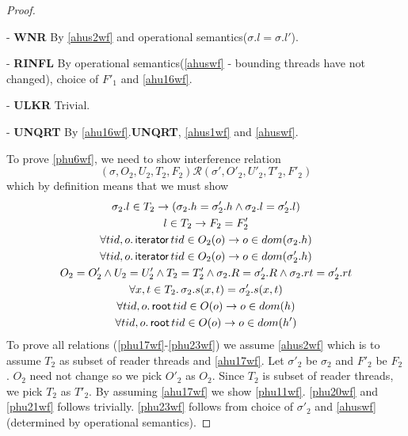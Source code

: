 \begin{proof}
\begin{case} - \textbf{WNR} By \ref{ahus2wf} and operational semantics($\sigma.l = \sigma.l'$).
\end{case}
\begin{case} - \textbf{RINFL} By operational semantics(\ref{ahuswf} - bounding threads have not changed), choice of $F'_1$ and \ref{ahu16wf}. 
\end{case}
\begin{case} - \textbf{ULKR} Trivial. 
\end{case}
\begin{case} - \textbf{UNQRT} By \ref{ahu16wf}.\textbf{UNQRT}, \ref{ahus1wf} and \ref{ahuswf}.
\end{case}

To prove \ref{phu6wf}, we need to show interference relation
\[(\sigma, O_2, U_2, T_2,F_2) \mathcal{R} (\sigma', O'_2, U'_2, T'_2,F'_2)  \]
which by definition means that we must show 
\begin{gather}\label{phu17wf}
  \sigma_2.l  \in  T_2 \rightarrow (\sigma_2.h =\sigma'_2.h \land \sigma_2.l=\sigma'_2.l)\\
  \label{phu18wf}
  l\in T_2\rightarrow F_2=F_2'\\
  \label{phu20wf}
  \forall tid,o\ldotp\textsf{iterator} \, tid \in O_2(o) \rightarrow o \in dom(\sigma_2.h) \\
  \label{phu21wf}
  \forall tid,o\ldotp\textsf{iterator} \, tid \in O_2(o) \rightarrow o \in dom(\sigma'_2.h) \\
  \label{phu22wf}
  O_2 = O_2' \land U_2 = U_2' \land T_2 = T_2'\land \sigma_2.R = \sigma'_2.R \land \sigma_2.rt = \sigma'_2.rt \\
  \label{phu23wf}
  \forall x, t \in T_2 \ldotp \sigma_2.s(x,t) = \sigma'_2.s(x,t)\\
  \label{phuwfrt1}
  \forall tid,o\ldotp\textsf{root} \, tid \in O(o) \rightarrow o \in dom(h) \\
  \label{phuwfrt2}
  \forall tid,o\ldotp\textsf{root} \, tid \in O(o) \rightarrow o \in dom(h') 
\end{gather}
To prove all relations (\ref{phu17wf}-\ref{phu23wf}) we assume \ref{ahus2wf} which is to assume $T_2$ as subset of reader threads and \ref{ahu17wf}. Let $\sigma'_2$ be $\sigma_2$ and $F'_2$ be $F_2$. $O_2$ need not change so we pick $O'_2$  as $O_2$. Since $T_2$ is subset of reader threads, we pick $T_2$ as  $T'_2$. By assuming \ref{ahu17wf}  we show \ref{phu11wf}. \ref{phu20wf} and \ref{phu21wf} follows trivially. \ref{phu23wf} follows from choice of $\sigma'_2$ and \ref{ahuswf}(determined by operational semantics).



\end{proof}
